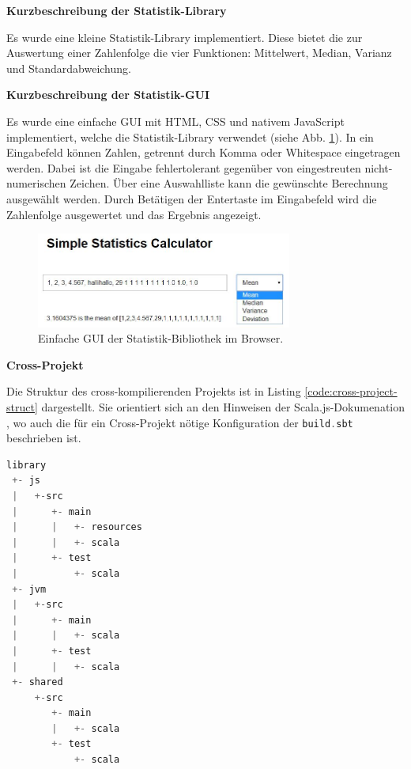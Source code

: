 \documentclass[a4paper, 12pt, hidelinks, listof=totoc, listoftables=totoc, bibliography=totoc]{scrreprt}
\newcommand{\code}[1]{\lstinline[language=Scala, style=inline]|#1|}
\newcommand{\MyMiniSec}[1]{\rmfamily\fontsize{12}{15}\selectfont
	\vspace{7pt}\textbf{#1} %
}
\begin{document}
\MyMiniSec{Kurzbeschreibung der Statistik-Library}

Es wurde eine kleine Statistik-Library implementiert. Diese bietet die zur Auswertung einer Zahlenfolge die 
vier Funktionen: Mittelwert, Median, Varianz und Standardabweichung.

\MyMiniSec{Kurzbeschreibung der Statistik-GUI}

Es wurde eine einfache GUI mit \ac{HTML}, \ac{CSS} und nativem JavaScript implementiert, welche die Statistik-Library verwendet (siehe Abb. \ref{fig:stat-lib-gui}). In ein Eingabefeld können Zahlen, getrennt durch Komma oder Whitespace eingetragen werden. Dabei ist die Eingabe fehlertolerant gegenüber von eingestreuten nicht-numerischen Zeichen. Über eine Auswahlliste kann die gewünschte Berechnung ausgewählt werden. Durch Betätigen der Entertaste im Eingabefeld wird die Zahlenfolge ausgewertet und das Ergebnis angezeigt.

\begin{figure}[!h]
    \centering
    \includegraphics[width=0.75\textwidth, frame]{statistics-lib/statistics-gui}
    \caption{Einfache GUI der Statistik-Bibliothek im Browser.}
    \label{fig:stat-lib-gui}
\end{figure}


\MyMiniSec{Cross-Projekt}

Die Struktur des cross-kompilierenden Projekts ist in Listing \ref{code:cross-project-struct} dargestellt. Sie orientiert sich an den Hinweisen der Scala.js-Dokumenation \cite{scalajs.CBP}, wo auch die für ein Cross-Projekt nötige Konfiguration der \code{build.sbt} beschrieben ist.

\begin{lstlisting}[language=scala, caption={Struktur der cross-kompilierenden Scala.js-Library}, label={code:cross-project-struct}]
library
 +- js
 |   +-src
 |      +- main
 |      |   +- resources
 |      |   +- scala
 |      +- test
 |          +- scala
 +- jvm
 |   +-src
 |      +- main
 |      |   +- scala
 |      +- test
 |      |   +- scala
 +- shared
     +-src
        +- main
        |   +- scala
        +- test
            +- scala
\end{lstlisting}
\end{document}
